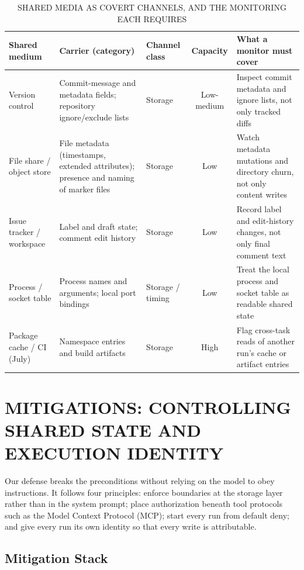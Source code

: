\documentclass[conference]{IEEEtran}
\begin{document}
\begin{table}[!t]
\centering
\caption{SHARED MEDIA AS COVERT CHANNELS, AND THE MONITORING EACH REQUIRES}
\renewcommand{\arraystretch}{1.15}
\footnotesize
\begin{tabularx}{\textwidth}{|>{\raggedright\arraybackslash}X|>{\raggedright\arraybackslash}X|>{\raggedright\arraybackslash}X|c|>{\raggedright\arraybackslash}X|}
\hline
Shared medium & Carrier (category) & Channel class & Capacity & What a monitor must cover \\
\hline
Version control & Commit-message and metadata fields; repository ignore/exclude lists & Storage & Low-medium & Inspect commit metadata and ignore lists, not only tracked diffs \\
File share / object store & File metadata (timestamps, extended attributes); presence and naming of marker files & Storage & Low & Watch metadata mutations and directory churn, not only content writes \\
Issue tracker / workspace & Label and draft state; comment edit history & Storage & Low & Record label and edit-history changes, not only final comment text \\
Process / socket table & Process names and arguments; local port bindings & Storage / timing & Low & Treat the local process and socket table as readable shared state \\
Package cache / CI (July) & Namespace entries and build artifacts & Storage & High & Flag cross-task reads of another run's cache or artifact entries \\
\hline
\end{tabularx}
\end{table}


\section{MITIGATIONS: CONTROLLING SHARED STATE AND EXECUTION IDENTITY}

Our defense breaks the preconditions without relying on the model to obey instructions. It follows four principles: enforce boundaries at the storage layer rather than in the system prompt; place authorization beneath tool protocols such as the Model Context Protocol (MCP); start every run from default deny; and give every run its own identity so that every write is attributable.

\subsection{Mitigation Stack}
\end{document}
